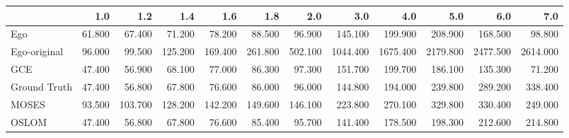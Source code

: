 \begin{tabular}{lrrrrrrrrrrr}
\toprule
{} &    1.0 &     1.2 &     1.4 &     1.6 &     1.8 &     2.0 &      3.0 &      4.0 &      5.0 &      6.0 &      7.0 \\
\midrule
Ego          & 61.800 &  67.400 &  71.200 &  78.200 &  88.500 &  96.900 &  145.100 &  199.900 &  208.900 &  168.500 &   98.800 \\
Ego-original & 96.000 &  99.500 & 125.200 & 169.400 & 261.800 & 502.100 & 1044.400 & 1675.400 & 2179.800 & 2477.500 & 2614.000 \\
GCE          & 47.400 &  56.900 &  68.100 &  77.000 &  86.300 &  97.300 &  151.700 &  199.700 &  186.100 &  135.300 &   71.200 \\
Ground Truth & 47.400 &  56.800 &  67.800 &  76.600 &  86.000 &  96.000 &  144.800 &  194.000 &  239.800 &  289.200 &  338.400 \\
MOSES        & 93.500 & 103.700 & 128.200 & 142.200 & 149.600 & 146.100 &  223.800 &  270.100 &  329.800 &  330.400 &  249.000 \\
OSLOM        & 47.400 &  56.800 &  67.800 &  76.600 &  85.400 &  95.700 &  141.400 &  178.500 &  198.300 &  212.600 &  214.800 \\
\bottomrule
\end{tabular}
